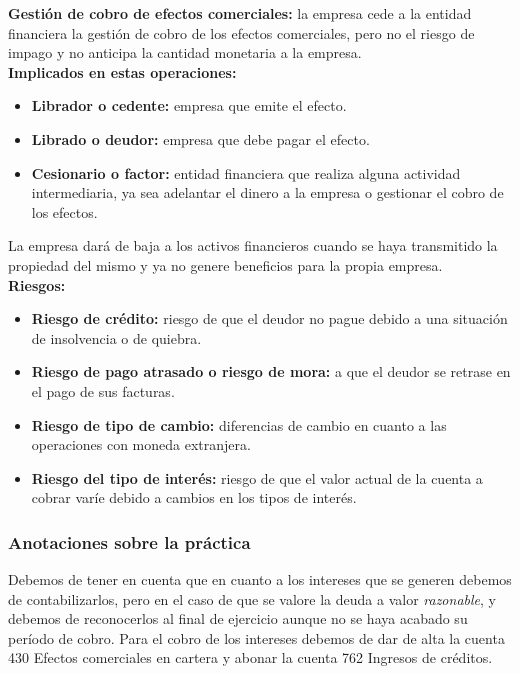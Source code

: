 \documentclass[a4paper,12pt]{article}
\begin{document}
\textbf{Gestión de cobro de efectos comerciales:} la empresa cede a la entidad financiera la gestión de cobro de los efectos comerciales, pero no el riesgo de impago y no anticipa la cantidad monetaria a la empresa.\\

\textbf{Implicados en estas operaciones:}
\begin{itemize}
    \item \textbf{Librador o cedente:} empresa que emite el efecto.
    \item \textbf{Librado o deudor:} empresa que debe pagar el efecto.
    \item \textbf{Cesionario o factor:} entidad financiera que realiza alguna actividad intermediaria, ya sea adelantar el dinero a la empresa o gestionar el cobro de los efectos.
\end{itemize}

La empresa dará de baja a los activos financieros cuando se haya transmitido la propiedad del mismo y ya no genere beneficios para la propia empresa.\\

\textbf{Riesgos:}
\begin{itemize}
    \item \textbf{Riesgo de crédito:} riesgo de que el deudor no pague debido a una situación de insolvencia o de quiebra.
    \item \textbf{Riesgo de pago atrasado o riesgo de mora:} a que el deudor se retrase en el pago de sus facturas.
    \item \textbf{Riesgo de tipo de cambio:} diferencias de cambio en cuanto a las operaciones con moneda extranjera.
    \item \textbf{Riesgo del tipo de interés:} riesgo de que el valor actual de la cuenta a cobrar varíe debido a cambios en los tipos de interés.
\end{itemize}

\subsubsection*{Anotaciones sobre la práctica}

Debemos de tener en cuenta que en cuanto a los intereses que se generen debemos de contabilizarlos, pero en el caso de que se valore la deuda a valor \textit{razonable}, y debemos de reconocerlos al final de ejercicio aunque no se haya acabado su período de cobro. Para el cobro de los intereses debemos de dar de alta la cuenta 430 Efectos comerciales en cartera y abonar la cuenta 762 Ingresos de créditos.\\
\end{document}
